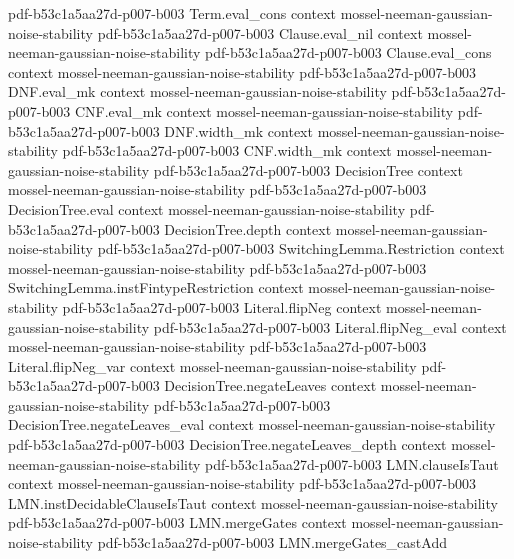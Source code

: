 \begin{theorem}
  {pdf-b53c1a5aa27d-p007-b003}
\proofstep
  {Term.eval_cons}
  {context}
  {mossel-neeman-gaussian-noise-stability}
  {pdf-b53c1a5aa27d-p007-b003}
\proofstep
  {Clause.eval_nil}
  {context}
  {mossel-neeman-gaussian-noise-stability}
  {pdf-b53c1a5aa27d-p007-b003}
\proofstep
  {Clause.eval_cons}
  {context}
  {mossel-neeman-gaussian-noise-stability}
  {pdf-b53c1a5aa27d-p007-b003}
\proofstep
  {DNF.eval_mk}
  {context}
  {mossel-neeman-gaussian-noise-stability}
  {pdf-b53c1a5aa27d-p007-b003}
\proofstep
  {CNF.eval_mk}
  {context}
  {mossel-neeman-gaussian-noise-stability}
  {pdf-b53c1a5aa27d-p007-b003}
\proofstep
  {DNF.width_mk}
  {context}
  {mossel-neeman-gaussian-noise-stability}
  {pdf-b53c1a5aa27d-p007-b003}
\proofstep
  {CNF.width_mk}
  {context}
  {mossel-neeman-gaussian-noise-stability}
  {pdf-b53c1a5aa27d-p007-b003}
\proofstep
  {DecisionTree}
  {context}
  {mossel-neeman-gaussian-noise-stability}
  {pdf-b53c1a5aa27d-p007-b003}
\proofstep
  {DecisionTree.eval}
  {context}
  {mossel-neeman-gaussian-noise-stability}
  {pdf-b53c1a5aa27d-p007-b003}
\proofstep
  {DecisionTree.depth}
  {context}
  {mossel-neeman-gaussian-noise-stability}
  {pdf-b53c1a5aa27d-p007-b003}
\proofstep
  {SwitchingLemma.Restriction}
  {context}
  {mossel-neeman-gaussian-noise-stability}
  {pdf-b53c1a5aa27d-p007-b003}
\proofstep
  {SwitchingLemma.instFintypeRestriction}
  {context}
  {mossel-neeman-gaussian-noise-stability}
  {pdf-b53c1a5aa27d-p007-b003}
\proofstep
  {Literal.flipNeg}
  {context}
  {mossel-neeman-gaussian-noise-stability}
  {pdf-b53c1a5aa27d-p007-b003}
\proofstep
  {Literal.flipNeg_eval}
  {context}
  {mossel-neeman-gaussian-noise-stability}
  {pdf-b53c1a5aa27d-p007-b003}
\proofstep
  {Literal.flipNeg_var}
  {context}
  {mossel-neeman-gaussian-noise-stability}
  {pdf-b53c1a5aa27d-p007-b003}
\proofstep
  {DecisionTree.negateLeaves}
  {context}
  {mossel-neeman-gaussian-noise-stability}
  {pdf-b53c1a5aa27d-p007-b003}
\proofstep
  {DecisionTree.negateLeaves_eval}
  {context}
  {mossel-neeman-gaussian-noise-stability}
  {pdf-b53c1a5aa27d-p007-b003}
\proofstep
  {DecisionTree.negateLeaves_depth}
  {context}
  {mossel-neeman-gaussian-noise-stability}
  {pdf-b53c1a5aa27d-p007-b003}
\proofstep
  {LMN.clauseIsTaut}
  {context}
  {mossel-neeman-gaussian-noise-stability}
  {pdf-b53c1a5aa27d-p007-b003}
\proofstep
  {LMN.instDecidableClauseIsTaut}
  {context}
  {mossel-neeman-gaussian-noise-stability}
  {pdf-b53c1a5aa27d-p007-b003}
\proofstep
  {LMN.mergeGates}
  {context}
  {mossel-neeman-gaussian-noise-stability}
  {pdf-b53c1a5aa27d-p007-b003}
\proofstep
  {LMN.mergeGates_castAdd}

\end{theorem}
